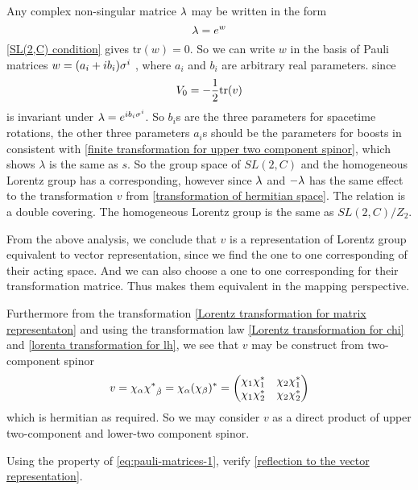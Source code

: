 Any complex non-singular matrice $\lambda$ may be written in the form
\begin{equation}
    \lambda = e^{w}
\end{equation}
 \eqref{SL(2,C) condition} gives $\text{tr}(w) = 0$. So we can write $w$ in the basis of Pauli matrices $w = (a_i+i b_i)\sigma^{i}$ , where $a_i$ and $b_i$ are arbitrary real parameters. since
\begin{equation}
    V_0 = -\frac{1}{2}\text{tr}(v)
\end{equation}
is invariant under $\lambda = e^{i b_i\sigma^{i}}$. So $b_i$s are the three parameters for spacetime rotations, the other three parameters $a_i$s should be the parameters for boosts in consistent with \eqref{finite transformation for upper two component spinor}, which shows $\lambda$ is the same as $s$. So the group space of $SL(2,C)$ and the homogeneous Lorentz group has a corresponding, however since $\lambda$ and $-\lambda$ has the same effect to the transformation $v$ from \eqref{transformation of hermitian space}. The relation is a double covering. The homogeneous Lorentz group is the same as $SL(2,C)/Z_2$.

From the above analysis, we conclude that $v$ is a representation of Lorentz group equivalent to vector representation, since we find the one to one corresponding of their acting space. And we can also choose a one to one corresponding for their transformation matrice. Thus makes them equivalent in the mapping perspective.

Furthermore from the transformation \eqref{Lorentz transformation for matrix representaton} and using the transformation law \eqref{Lorentz transformation for chi} and \eqref{lorenta transformation for lh}, we see that $v$ may be construct from two-component spinor
\begin{equation}
  v = \chi_\a \lc_{\dob}=\chi_\a(\chi_{\be})^*
=\mqty(\chi_1\chi_1^* & \chi_2\chi_1^*
  \\\chi_1\chi_2^* & \chi_2\chi_2^*)
\end{equation}
which is hermitian as required. So we may consider $v$ as a direct product of upper two-component and lower-two component spinor.

\begin{Exe}
Using the property of \eqref{eq:pauli-matrices-1}, verify \eqref{reflection to the vector representation}.
\end{Exe}




